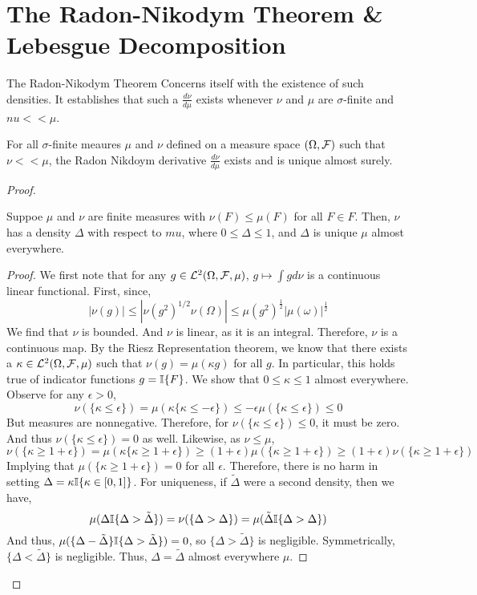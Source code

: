 \section{The Radon-Nikodym Theorem \& Lebesgue Decomposition}

The Radon-Nikodym Theorem Concerns itself with the existence of such densities. It establishes that 
such a $\frac{d\nu}{d\mu}$ exists whenever $\nu$ and $\mu$ are $\sigma$-finite and 
$nu << \mu$. 

\begin{theorem}
    For all $\sigma$-finite meaures $\mu$ and $\nu$ defined on a measure space 
    $(\Omega, \mathcal F)$ such that $\nu << \mu$, the Radon Nikdoym derivative $\frac{d\nu}{d\mu}$ exists 
    and is unique almost surely.
\end{theorem}
\begin{proof}

    \begin{lemma} 
        Suppoe $\mu$ and $\nu$ are finite measures with $\nu(F) \leq \mu(F)$ for all 
        $F \in F$. Then, $\nu$ has a density $\Delta$ with respect to $mu$, where 
        $0 \leq \Delta \leq 1$, and $\Delta$ is unique $\mu$ almost everywhere.
    \end{lemma}
    \begin{proof}
        We first note that for any $g \in \mathcal L^2(\Omega, \mathcal F, \mu)$, $g \mapsto \int g d\nu$ is a continuous linear functional. 
        First, since, 
        \[ |\nu(g)| \leq |\nu(g^2)^{1/2}\nu(\Omega)| \leq \mu(g^2)^\frac{1}{2} |\mu(\omega)|^\frac{1}{2}  \]
        We find that $\nu$ is bounded. And $\nu$ is linear, as it is an integral. Therefore, 
        $\nu$ is a continuous map. By the Riesz Representation theorem, we know that there exists a 
        $\kappa \in \mathcal L^2(\Omega, \mathcal F, \mu)$ such that $\nu(g) = \mu(\kappa g)$ for all $g$. In particular, 
        this holds true of indicator functions $g = \mathbb I\{F\}$. We show that 
        $0 \leq \kappa \leq 1$ almost everywhere. Observe for any $\epsilon > 0$,
        \[\nu(\{\kappa \leq \epsilon\}) = \mu(\kappa\{\kappa \leq -\epsilon\}) \leq -\epsilon \mu(\{\kappa \leq \epsilon\}) \leq 0 \] 
        But measures are nonnegative. Therefore, for $\nu(\{\kappa \leq \epsilon\}) \leq 0$, it must be zero. And thus 
        $\nu(\{\kappa \leq \epsilon\}) = 0$ as well. Likewise, as $\nu \leq \mu$, 
        \[ \nu(\{\kappa \geq 1 + \epsilon \}) = \mu(\kappa\{\kappa \geq 1 + \epsilon\}) \geq (1 + \epsilon)\mu(\{\kappa \geq 1 + \epsilon\}) \geq (1 + \epsilon)\nu(\{\kappa \geq 1 + \epsilon\}) \] 
        Implying that $\mu(\{\kappa \geq 1 + \epsilon\}) = 0$ for all $\epsilon$. Therefore, there is no harm in setting 
        $\Delta = \kappa\mathbb I\{\kappa \in [0,1]\}$. For uniqueness, if $\tilde{\Delta}$ were a second density, then we have, 
        \[  \mu(\Delta\mathbb I\{\Delta > \tilde{\Delta}\}) = \nu(\{\Delta > \Delta\}) =  \mu(\tilde{\Delta}\mathbb I\{\Delta > \Delta\}) \]
        And thus, $\mu(\{\Delta - \tilde{\Delta}\}\mathbb I\{\Delta > \tilde{\Delta}\}) = 0$, so $\{\Delta > \tilde{\Delta}\}$ is negligible. 
        Symmetrically, $\{\Delta < \tilde{\Delta}\}$ is negligible. Thus, $\Delta = \tilde{\Delta}$ almost everywhere $\mu$.


\end{proof}
\end{proof}
